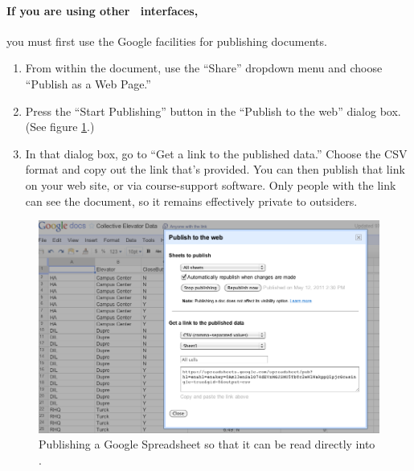 \paragraph{If you are using other \R\ interfaces,} you must first use the Google
  facilities for publishing documents.
\begin{enumerate}
  \item From within the document, use the ``Share'' dropdown menu and
    choose ``Publish as a Web Page.''
   \item Press the ``Start Publishing'' button in the ``Publish to the
     web'' dialog box. (See figure \ref{fig:publish-google}.)
   \item In that dialog box, go to ``Get a link to the published
     data.''  Choose the CSV format and copy out the link that's
     provided.  You can then publish that link on your web site, or via
     course-support software.  Only people with the link can see the
     document, so it remains effectively private to outsiders.
\end{enumerate}


\begin{figure}
\begin{center}
  \includegraphics[width=4.5in]{images/publishing-google1.png}
\end{center}
\caption{\label{fig:publish-google}Publishing a Google Spreadsheet so that it can be read
    directly into \R.}
\end{figure}


